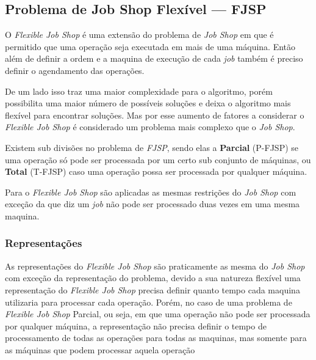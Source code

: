 


    \subsection{Problema de Job Shop Flexível — FJSP}
            O \textit{Flexible Job Shop} é uma extensão do problema de \textit{Job Shop} em que é permitido que uma operação seja executada em mais de uma máquina. Então além de definir a ordem e a maquina de execução de cada \textit{job} também é preciso definir o agendamento das operações.\hfill\vspace{\onelineskip}
            
            De um lado isso traz uma maior complexidade para o algoritmo, porém possibilita uma maior número de possíveis soluções e deixa o algoritmo mais flexível para encontrar soluções. Mas por esse aumento de fatores a considerar o \textit{Flexible Job Shop} é considerado um problema mais complexo que o \textit{Job Shop}.\hfill\vspace{\onelineskip}

            Existem sub divisões no problema de \textit{FJSP}, sendo elas a \textbf{Parcial} (P-FJSP) se uma operação só pode ser processada por um certo sub conjunto de máquinas, ou \textbf{Total} (T-FJSP) caso uma operação possa ser processada por qualquer máquina.\hfill\vspace{\onelineskip}

            Para o \textit{Flexible Job Shop} são aplicadas as mesmas restrições do \textit{Job Shop} com exceção da que diz um \textit{job} não pode ser processado duas vezes em uma mesma maquina.\hfill

        \subsubsection{Representações}
            As representações do \textit{Flexible Job Shop} são praticamente as mesma do \textit{Job Shop} com exceção da representação do problema, devido a sua natureza flexível uma representação do \textit{Flexible Job Shop} precisa definir quanto tempo cada maquina utilizaria para processar cada operação. Porém, no caso de uma problema de \textit{Flexible Job Shop} Parcial, ou seja, em que uma operação não pode ser processada por qualquer máquina, a representação não precisa definir o tempo de processamento de todas as operações para todas as maquinas, mas somente para as máquinas que podem processar aquela operação


